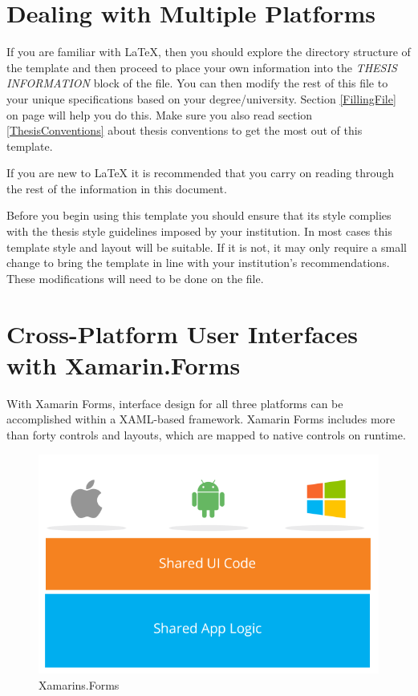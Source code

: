 \section{Dealing with Multiple Platforms}

If you are familiar with \LaTeX{}, then you should explore the directory structure of the template and then proceed to place your own information into the \emph{THESIS INFORMATION} block of the  file. You can then modify the rest of this file to your unique specifications based on your degree/university. Section \ref{FillingFile} on page \pageref{FillingFile} will help you do this. Make sure you also read section \ref{ThesisConventions} about thesis conventions to get the most out of this template.

If you are new to \LaTeX{} it is recommended that you carry on reading through the rest of the information in this document.

Before you begin using this template you should ensure that its style complies with the thesis style guidelines imposed by your institution. In most cases this template style and layout will be suitable. If it is not, it may only require a small change to bring the template in line with your institution's recommendations. These modifications will need to be done on the  file.


\section{Cross-Platform User Interfaces with Xamarin.Forms}

With Xamarin Forms, interface design for all three platforms can be accomplished within a XAML-based framework. Xamarin Forms includes more than forty controls and layouts, which are mapped to native controls on runtime.


\begin{figure}[th]
\centering
\includegraphics[width=\textwidth] {Figures/xamarins-forms}

\caption[xamarinsforms]{Xamarins.Forms}
\label{fig:architecture}
\end{figure}



